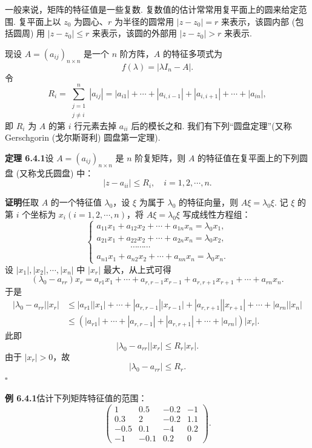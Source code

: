 \documentclass[UTF8,12pt,a4paper,fontset=fandol]{ctexart}
\begin{document}
一般来说，矩阵的特征值是一些复数. 复数值的估计常常用复平面上的圆来给定范围. 复平面上以 $z_0$ 为圆心、$r$ 为半径的圆常用 $|z-z_0|=r$ 来表示，该圆内部 (包括圆周) 用 $|z-z_0|\leq r$ 来表示，该圆的外部用 $|z-z_0|>r$ 来表示.

现设 $A=(a_{ij})_{n\times n}$ 是一个 $n$ 阶方阵，$A$ 的特征多项式为
\[
f(\lambda)=|\lambda I_n-A|.
\]
令
\[
R_i=\sum_{\substack{j=1\\j\neq i}}^n |a_{ij}|=|a_{i1}|+\cdots+|a_{i,i-1}|+|a_{i,i+1}|+\cdots+|a_{in}|,
\]
即 $R_i$ 为 $A$ 的第 $i$ 行元素去掉 $a_{ii}$ 后的模长之和. 我们有下列“圆盘定理”(又称 Gerschgorin (戈尔斯哥利) 圆盘第一定理).

\noindent\textbf{定理 6.4.1}\quad 设 $A=(a_{ij})_{n\times n}$ 是 $n$ 阶复矩阵，则 $A$ 的特征值在复平面上的下列圆盘 (又称戈氏圆盘) 中：
\[
|z-a_{ii}|\leq R_i,\quad i=1,2,\cdots,n.
\]

\noindent\textbf{证明}\quad 任取 $A$ 的一个特征值 $\lambda_0$，设 $\xi$ 为属于 $\lambda_0$ 的特征向量，则 $A\xi=\lambda_0\xi$. 记 $\xi$ 的第 $i$ 个坐标为 $x_i(i=1,2,\cdots,n)$，将 $A\xi=\lambda_0\xi$ 写成线性方程组：
\[
\left\{\begin{array}{l}
a_{11}x_1+a_{12}x_2+\cdots+a_{1n}x_n=\lambda_0x_1,\\
a_{21}x_1+a_{22}x_2+\cdots+a_{2n}x_n=\lambda_0x_2,\\
\qquad\qquad\cdots\cdots\cdots\\
a_{n1}x_1+a_{n2}x_2+\cdots+a_{nn}x_n=\lambda_0x_n.
\end{array}\right.
\]
设 $|x_1|,|x_2|,\cdots,|x_n|$ 中 $|x_r|$ 最大，从上式可得
\[
(\lambda_0-a_{rr})x_r=a_{r1}x_1+\cdots+a_{r,r-1}x_{r-1}+a_{r,r+1}x_{r+1}+\cdots+a_{rn}x_n.
\]
于是
\[
\begin{aligned}
|\lambda_0-a_{rr}||x_r|
&\leq |a_{r1}||x_1|+\cdots+|a_{r,r-1}||x_{r-1}|+|a_{r,r+1}||x_{r+1}|+\cdots+|a_{rn}||x_n|\\
&\leq (|a_{r1}|+\cdots+|a_{r,r-1}|+|a_{r,r+1}|+\cdots+|a_{rn}|)|x_r|.
\end{aligned}
\]
此即
\[
|\lambda_0-a_{rr}||x_r|\leq R_r|x_r|.
\]
由于 $|x_r|>0$，故
\[
|\lambda_0-a_{rr}|\leq R_r.
\]
$\square$

\noindent\textbf{例 6.4.1}\quad 估计下列矩阵特征值的范围：
\[
\left(\begin{array}{rrrr}
1 & 0.5 & -0.2 & -1\\
0.3 & 2 & -0.2 & 1.1\\
-0.5 & 0.1 & -4 & 0.2\\
-1 & -0.1 & 0.2 & 0
\end{array}\right).
\]
\end{document}
